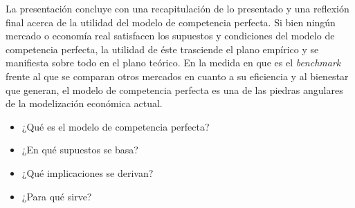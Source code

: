 \documentclass{nuevotema}
\begin{document}
La presentación concluye con una recapitulación de lo presentado y una reflexión final acerca de la utilidad del modelo de competencia perfecta. Si bien ningún mercado o economía real satisfacen los supuestos y condiciones del modelo de competencia perfecta, la utilidad de éste trasciende el plano empírico y se manifiesta sobre todo en el plano teórico. En la medida en que es el \textit{benchmark} frente al que se comparan otros mercados en cuanto a su eficiencia y al bienestar que generan, el modelo de competencia perfecta es una de las piedras angulares de la modelización económica actual.

\begin{itemize}
	\item ¿Qué es el modelo de competencia perfecta?
	\item ¿En qué supuestos se basa?
	\item ¿Qué implicaciones se derivan?
	\item ¿Para qué sirve?
\end{itemize}

\esquemacorto
\end{document}
